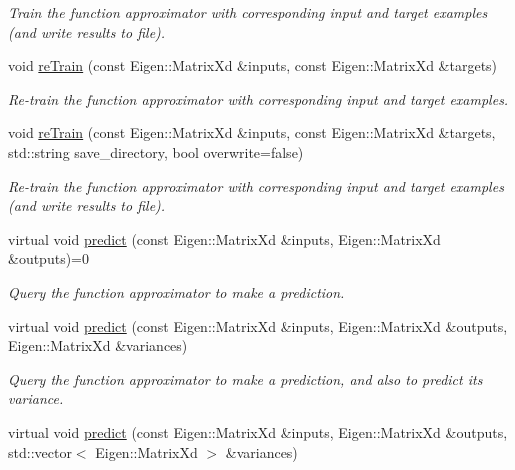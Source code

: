 \begin{DoxyCompactItemize}
\begin{DoxyCompactList}\small\item\em Train the function approximator with corresponding input and target examples (and write results to file). \end{DoxyCompactList}\item 
void \hyperlink{classDmpBbo_1_1FunctionApproximator_a9cd60cd8e54e32893050894ed2190610}{re\+Train} (const Eigen\+::\+Matrix\+Xd \&inputs, const Eigen\+::\+Matrix\+Xd \&targets)
\begin{DoxyCompactList}\small\item\em Re-\/train the function approximator with corresponding input and target examples. \end{DoxyCompactList}\item 
void \hyperlink{classDmpBbo_1_1FunctionApproximator_a2e826de92492a7b3b6bdba74e50d13a9}{re\+Train} (const Eigen\+::\+Matrix\+Xd \&inputs, const Eigen\+::\+Matrix\+Xd \&targets, std\+::string save\+\_\+directory, bool overwrite=false)
\begin{DoxyCompactList}\small\item\em Re-\/train the function approximator with corresponding input and target examples (and write results to file). \end{DoxyCompactList}\item 
virtual void \hyperlink{classDmpBbo_1_1FunctionApproximator_a0547681a81d4c43ce2601f16047baf7a}{predict} (const Eigen\+::\+Matrix\+Xd \&inputs, Eigen\+::\+Matrix\+Xd \&outputs)=0
\begin{DoxyCompactList}\small\item\em Query the function approximator to make a prediction. \end{DoxyCompactList}\item 
virtual void \hyperlink{classDmpBbo_1_1FunctionApproximator_a98f578f3032ed35e87e036bd81a48d3f}{predict} (const Eigen\+::\+Matrix\+Xd \&inputs, Eigen\+::\+Matrix\+Xd \&outputs, Eigen\+::\+Matrix\+Xd \&variances)
\begin{DoxyCompactList}\small\item\em Query the function approximator to make a prediction, and also to predict its variance. \end{DoxyCompactList}\item 
virtual void \hyperlink{classDmpBbo_1_1FunctionApproximator_aab1e8947dae8a700a623dc49e6440083}{predict} (const Eigen\+::\+Matrix\+Xd \&inputs, Eigen\+::\+Matrix\+Xd \&outputs, std\+::vector$<$ Eigen\+::\+Matrix\+Xd $>$ \&variances)

\end{DoxyCompactItemize}
